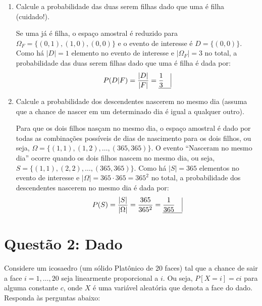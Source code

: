 \documentclass[12 pt]{article}
\begin{document}
\begin{enumerate}
    \item Calcule a probabilidade das duas serem filhas dado que uma é filha (cuidado!).
    \begin{tcolorbox}[colframe=black, title=Resposta:]
        Se uma já é filha, o espaço amostral é reduzido para $\Omega_F = \{(0,1), (1,0), (0,0)\}$ e o evento de interesse é $D = \{(0,0)\}$. Como há $|D| = 1$ elemento no evento de interesse e $|\Omega_F| = 3$ no total, a probabilidade das duas serem filhas dado que uma é filha é dada por:
        $$P(D|F) = \frac{|D|}{|F|} = \underline{ \frac{1}{3} \quad \vline}$$
    \end{tcolorbox}
    \newpage
    \item Calcule a probabilidade dos descendentes nascerem no mesmo dia (assuma que a chance de nascer em um determinado dia é igual a qualquer outro).
    \begin{tcolorbox}[colframe=black, title=Resposta:]
        Para que os dois filhos nasçam no mesmo dia, o espaço amostral é dado por todas as combinações possíveis de dias de nascimento para os dois filhos, ou seja, $\Omega = \{(1,1), (1,2), \dots, (365,365)\}$. O evento ``Nasceram no mesmo dia'' ocorre quando os dois filhos nascem no mesmo dia, ou seja, $S = \{(1,1), (2,2), \dots, (365,365)\}$. Como há $|S| = 365$ elementos no evento de interesse e $|\Omega| = 365 \cdot 365 = 365^2 $ no total, a probabilidade dos descendentes nascerem no mesmo dia é dada por:
        $$P(S) = \frac{|S|}{|\Omega|} = \frac{365}{365^2} = \underline{\frac{1}{365} \quad \vline}$$
    \end{tcolorbox}
\end{enumerate}

\section*{Questão 2: Dado}
Considere um icosaedro (um sólido Platônico de 20 faces) tal que a chance de sair a face $i = 1, \dots, 20$ seja
linearmente proporcional a $i$. Ou seja, $P [X = i] = ci$ para alguma constante $c$, onde $X$ é uma variável
aleatória que denota a face do dado. Responda às perguntas abaixo:
\end{document}
